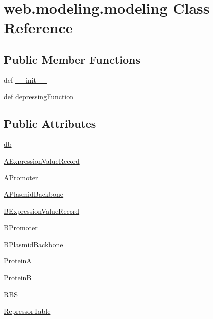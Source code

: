 \hypertarget{classweb_1_1modeling_1_1modeling}{\section{web.\-modeling.\-modeling Class Reference}
\label{classweb_1_1modeling_1_1modeling}
}
\subsection*{Public Member Functions}
\begin{DoxyCompactItemize}
\item 
def \hyperlink{classweb_1_1modeling_1_1modeling_a7898b83d4325000468bf3b19dd0cf009}{\-\_\-\-\_\-init\-\_\-\-\_\-}
\item 
def \hyperlink{classweb_1_1modeling_1_1modeling_ad21a9030cd229dc73b6318abff8733e6}{depressing\-Function}
\end{DoxyCompactItemize}
\subsection*{Public Attributes}
\begin{DoxyCompactItemize}
\item 
\hyperlink{classweb_1_1modeling_1_1modeling_affbc9a007f7b35ef14afce145c58bf18}{db}
\item 
\hyperlink{classweb_1_1modeling_1_1modeling_a7305302d2cd99859e0641132ac9ac0f3}{A\-Expression\-Value\-Record}
\item 
\hyperlink{classweb_1_1modeling_1_1modeling_a8fb8abde81146a93ee8f7e0ec8fedf7f}{A\-Promoter}
\item 
\hyperlink{classweb_1_1modeling_1_1modeling_ad8689aeec5372b03c7455f53d32cc1d8}{A\-Plasmid\-Backbone}
\item 
\hyperlink{classweb_1_1modeling_1_1modeling_ab2ab0f6fc77ef28f58988fffed95fa74}{B\-Expression\-Value\-Record}
\item 
\hyperlink{classweb_1_1modeling_1_1modeling_a96fa7c50494910911cd1bb5e0fd6c247}{B\-Promoter}
\item 
\hyperlink{classweb_1_1modeling_1_1modeling_a18419f401d8b614ce048cd4f61fe3720}{B\-Plasmid\-Backbone}
\item 
\hyperlink{classweb_1_1modeling_1_1modeling_a6da71e7f269b891b00412fc6897c9747}{Protein\-A}
\item 
\hyperlink{classweb_1_1modeling_1_1modeling_aff3389950cb599a298b6370a2dad0185}{Protein\-B}
\item 
\hyperlink{classweb_1_1modeling_1_1modeling_a4cc11ff2adba839163240e9ea66ef398}{R\-B\-S}
\item 
\hyperlink{classweb_1_1modeling_1_1modeling_a0314c62c089feb8e1d85448cc94f7900}{Repressor\-Table}
\end{DoxyCompactItemize}
